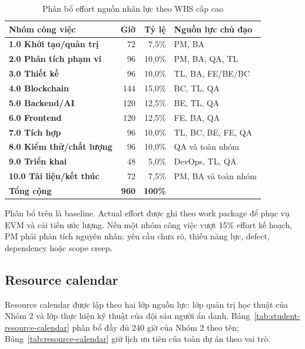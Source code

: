 \begin{table}[H]
\centering
\caption{Phân bổ effort nguồn nhân lực theo WBS cấp cao}
\label{tab:effort-allocation}
\begin{tabularx}{\textwidth}{| >{\bfseries}p{4.8cm} | r | r | X |}
\hline
Nhóm công việc & Giờ & Tỷ lệ & Nguồn lực chủ đạo \\
\hline
1.0 Khởi tạo/quản trị & 72 & 7,5\% & PM, BA \\ \hline
2.0 Phân tích phạm vi & 96 & 10,0\% & PM, BA, QA, TL \\ \hline
3.0 Thiết kế & 96 & 10,0\% & TL, BA, FE/BE/BC \\ \hline
4.0 Blockchain & 144 & 15,0\% & BC, TL, QA \\ \hline
5.0 Backend/AI & 120 & 12,5\% & BE, TL, QA \\ \hline
6.0 Frontend & 120 & 12,5\% & FE, BA, QA \\ \hline
7.0 Tích hợp & 96 & 10,0\% & TL, BC, BE, FE, QA \\ \hline
8.0 Kiểm thử/chất lượng & 96 & 10,0\% & QA và toàn nhóm \\ \hline
9.0 Triển khai & 48 & 5,0\% & DevOps, TL, QA \\ \hline
10.0 Tài liệu/kết thúc & 72 & 7,5\% & PM, BA và toàn nhóm \\
\hline
\textbf{Tổng cộng} & \textbf{960} & \textbf{100\%} & \\
\hline
\end{tabularx}
\end{table}

Phân bổ trên là baseline. Actual effort được ghi theo work package để phục vụ EVM và cải tiến ước lượng. Nếu một nhóm công việc vượt 15\% effort kế hoạch, PM phải phân tích nguyên nhân: yêu cầu chưa rõ, thiếu năng lực, defect, dependency hoặc scope creep.

\subsection{Resource calendar}

Resource calendar được lập theo hai lớp nguồn lực: lớp quản trị học thuật của Nhóm 2 và lớp thực hiện kỹ thuật của đội sáu người ẩn danh. Bảng~\ref{tab:student-resource-calendar} phân bổ đầy đủ 240 giờ của Nhóm 2 theo tên; Bảng~\ref{tab:resource-calendar} giữ lịch ưu tiên của toàn dự án theo vai trò.

